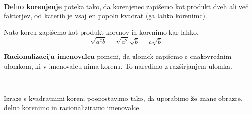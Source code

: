             

                ~~

                \textbf{Delno korenjenje} poteka tako, da korenjenec zapišemo kot produkt dveh ali več faktorjev,
                od katerih je vsaj en popoln kvadrat (ga lahko korenimo).
                
                Nato koren zapišemo kot produkt korenov in korenimo kar lahko.
                $$\sqrt{a^2b}=\sqrt{a^2}\sqrt{b}=a\sqrt{b}$$
            
                

                \textbf{Racionalizacija imenovalca} pomeni, da ulomek zapišemo z enakovrednim ulomkom, ki v imenovalcu nima korena.
                To naredimo z razširjanjem ulomka.
            
                    ~~
            
                Izraze s kvadratnimi koreni poenostavimo tako, da uporabimo že znane obrazce, delno korenimo in racionaliziramo imenovalce.
            
        ~~~


